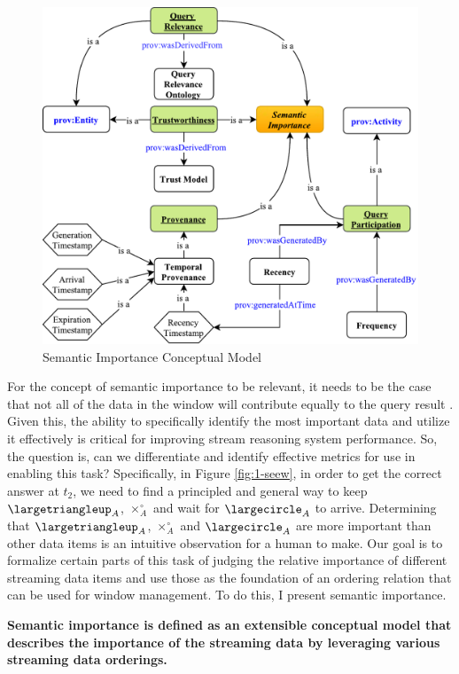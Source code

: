 \begin{figure}[!htbp]
	\centering
	\includegraphics[width=5in]{img/3-si.pdf}
	\caption{Semantic Importance Conceptual Model}
	\label{fig:3-si} 
\end{figure}

For the concept of semantic importance to be relevant, it needs to be the case that not all of the data in the window will contribute equally to the query result \cite{mileo2013streamrule}. 
Given this, the ability to specifically identify the most important data and utilize it effectively is critical for improving stream reasoning system performance. 
So, the question is, can we differentiate and identify effective metrics for use in enabling this task? 
Specifically, in Figure \ref{fig:1-seew}, in order to get the correct answer at $t_{2}$, we need to find a principled and general way to keep $\largetriangleup_{A}$, $\times^{\circ}_{A}$ and wait for $\largecircle_{A}$ to arrive. 
Determining that $\largetriangleup_{A}$, $\times^{\circ}_{A}$ and $\largecircle_{A}$ are more important than other data items is an intuitive observation for a human to make. 
Our goal is to formalize certain parts of this task of judging the relative importance of different streaming data items and use those as the foundation of an ordering relation that can be used for window management.
To do this, I present semantic importance.

\textbf{Semantic importance is defined as an extensible conceptual model that describes the importance of the streaming data by leveraging various streaming data orderings.}

